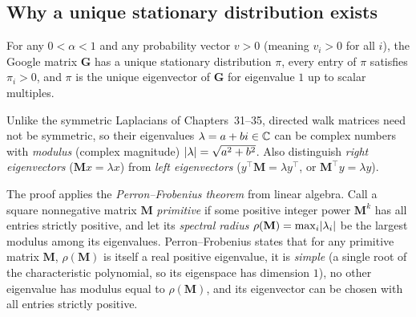 \subsection{Why a unique stationary distribution exists}

\begin{theorem}
\label{ch36:thm-existence}
For any $0 < \alpha < 1$ and any probability vector $v > 0$ (meaning $v_i > 0$ for all $i$), the Google matrix $\mathbf{G}$ has a unique stationary distribution $\pi$, every entry of $\pi$ satisfies $\pi_i > 0$, and $\pi$ is the unique eigenvector of $\mathbf{G}$ for eigenvalue $1$ up to scalar multiples.
\end{theorem}

\begin{whybox}
Unlike the symmetric Laplacians of Chapters~31--35, directed walk matrices need not be symmetric, so their eigenvalues $\lambda = a + bi \in \mathbb{C}$ can be complex numbers with \emph{modulus} (complex magnitude) $\lvert\lambda\rvert = \sqrt{a^2 + b^2}$. Also distinguish \emph{right eigenvectors} ($\mathbf{M}x = \lambda x$) from \emph{left eigenvectors} ($y^\top \mathbf{M} = \lambda y^\top$, or $\mathbf{M}^\top y = \lambda y$).

The proof applies the \emph{Perron--Frobenius theorem} from linear algebra. Call a square nonnegative matrix $\mathbf{M}$ \emph{primitive} if some positive integer power $\mathbf{M}^k$ has all entries strictly positive, and let its \emph{spectral radius} $\rho(\mathbf{M}) = \max_i \lvert\lambda_i\rvert$ be the largest modulus among its eigenvalues. Perron--Frobenius states that for any primitive matrix $\mathbf{M}$, $\rho(\mathbf{M})$ is itself a real positive eigenvalue, it is \emph{simple} (a single root of the characteristic polynomial, so its eigenspace has dimension $1$), no other eigenvalue has modulus equal to $\rho(\mathbf{M})$, and its eigenvector can be chosen with all entries strictly positive.
\end{whybox}

